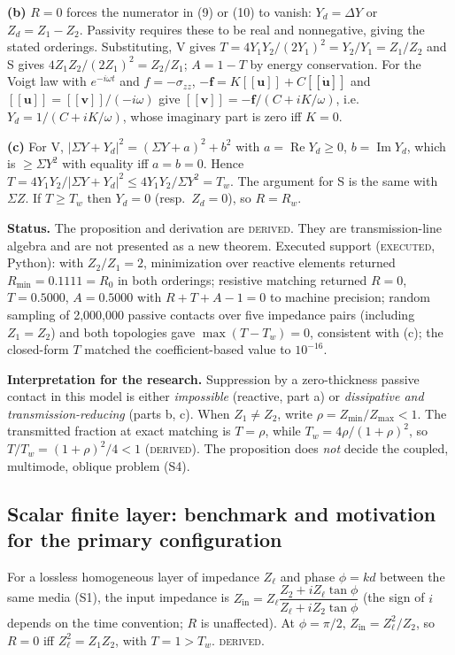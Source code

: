 \documentclass[11pt]{article}
\newcommand{\jj}{[\![}
\newcommand{\kk}{]\!]}
\begin{document}
\noindent\textbf{(b)} $R=0$ forces the numerator in (9) or (10) to vanish:
$Y_d=\Delta Y$ or $Z_d=Z_1-Z_2$. Passivity requires these to be real and
nonnegative, giving the stated orderings. Substituting, V gives
$T=4Y_1Y_2/(2Y_1)^2=Y_2/Y_1=Z_1/Z_2$ and S gives
$4Z_1Z_2/(2Z_1)^2=Z_2/Z_1$; $A=1-T$ by energy conservation. For the Voigt law with
$e^{-i\omega t}$ and $f=-\sigma_{zz}$, $-\bm{f}=K\jj\bm{u}\kk+C\jj\dot{\bm{u}}\kk$
and $\jj\bm{u}\kk=\jj\bm{v}\kk/(-i\omega)$ give
$\jj\bm{v}\kk=-\bm{f}/(C+iK/\omega)$, i.e.\ $Y_d=1/(C+iK/\omega)$, whose imaginary
part is zero iff $K=0$.

\noindent\textbf{(c)} For V, $\lvert\Sigma Y+Y_d\rvert^2=(\Sigma Y+a)^2+b^2$ with
$a=\operatorname{Re}Y_d\ge0$, $b=\operatorname{Im}Y_d$, which is $\ge\Sigma Y^2$
with equality iff $a=b=0$. Hence
$T=4Y_1Y_2/\lvert\Sigma Y+Y_d\rvert^2\le 4Y_1Y_2/\Sigma Y^2=T_w$. The argument for
S is the same with $\Sigma Z$. If $T\ge T_w$ then $Y_d=0$ (resp.\ $Z_d=0$), so
$R=R_w$.

\medskip
\noindent\textbf{Status.} The proposition and derivation are \textsc{derived}.
They are transmission-line algebra and are not presented as a new theorem.
Executed support (\textsc{executed}, Python): with $Z_2/Z_1=2$, minimization over
reactive elements returned $R_{\min}=0.1111=R_0$ in both orderings; resistive
matching returned $R=0$, $T=0.5000$, $A=0.5000$ with $R+T+A-1=0$ to machine
precision; random sampling of 2{,}000{,}000 passive contacts over five impedance
pairs (including $Z_1=Z_2$) and both topologies gave $\max(T-T_w)=0$, consistent
with (c); the closed-form $T$ matched the coefficient-based value to $10^{-16}$.

\textbf{Interpretation for the research.} Suppression by a zero-thickness passive
contact in this model is either \emph{impossible} (reactive, part a) or
\emph{dissipative and transmission-reducing} (parts b, c). When $Z_1\ne Z_2$,
write $\rho=Z_{\min}/Z_{\max}<1$. The transmitted fraction at exact matching is
$T=\rho$, while $T_w=4\rho/(1+\rho)^2$, so $T/T_w=(1+\rho)^2/4<1$
(\textsc{derived}). The proposition does \emph{not} decide the coupled,
multimode, oblique problem (S4).

\subsection{Scalar finite layer: benchmark and motivation for the primary
configuration}

For a lossless homogeneous layer of impedance $Z_\ell$ and phase $\phi=kd$
between the same media (S1), the input impedance is
$Z_{\text{in}} = Z_\ell\dfrac{Z_2+iZ_\ell\tan\phi}{Z_\ell+iZ_2\tan\phi}$ (the sign
of $i$ depends on the time convention; $R$ is unaffected). At $\phi=\pi/2$,
$Z_{\text{in}}=Z_\ell^2/Z_2$, so $R=0$ iff $Z_\ell^2=Z_1Z_2$, with $T=1>T_w$.
\textsc{derived}.
\end{document}
